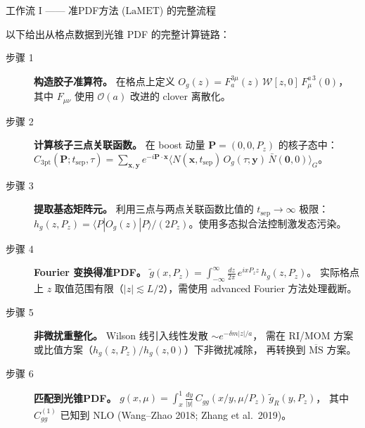 \documentclass[10pt,aspectratio=169]{beamer}
\newcommand{\msbar}{\overline{\mathrm{MS}}}
\newcommand{\LaMET}{\mathrm{LaMET}}
\begin{document}
\begin{frame}{工作流 I —— 准PDF方法 ($\LaMET$) 的完整流程}

  以下给出从格点数据到光锥 PDF 的完整计算链路：

  \begin{description}
    \item[步骤 1] \textbf{构造胶子准算符。} 在格点上定义
    $O_g(z) = F_a^{3\mu}(z)\, \mathcal{W}[z,0]\, F_{\mu}^{a\,3}(0)$，
    其中 $F_{\mu\nu}$ 使用 $\mathcal{O}(a)$ 改进的 clover 离散化。

    \item[步骤 2] \textbf{计算核子三点关联函数。} 在 boost 动量 $\mathbf{P} = (0,0,P_z)$ 的核子态中：
    $C_{3\mathrm{pt}}(\mathbf{P}; t_{\mathrm{sep}}, \tau) = \sum_{\mathbf{x},\mathbf{y}} e^{-i\mathbf{P}\cdot\mathbf{x}}
    \langle N(\mathbf{x}, t_{\mathrm{sep}})\, O_g(\tau;\mathbf{y})\, \bar{N}(\mathbf{0}, 0) \rangle_G$。

    \item[步骤 3] \textbf{提取基态矩阵元。} 利用三点与两点关联函数比值的 $t_{\mathrm{sep}} \to \infty$ 极限：
    $h_g(z, P_z) = \langle P| O_g(z) |P \rangle / (2P_z)$。使用多态拟合法控制激发态污染。

    \item[步骤 4] \textbf{Fourier 变换得准PDF。}
    $\tilde{g}(x, P_z) = \int_{-\infty}^{\infty} \frac{dz}{2\pi}\, e^{i x P_z z}\, h_g(z, P_z)$。
    实际格点上 $z$ 取值范围有限（$|z| \lesssim L/2$），需使用 advanced Fourier 方法处理截断。

    \item[步骤 5] \textbf{非微扰重整化。} Wilson 线引入线性发散 $\sim e^{-\delta m|z|/a}$，
    需在 RI/MOM 方案或比值方案（$h_g(z,P_z)/h_g(z,0)$）下非微扰减除，
    再转换到 $\msbar$ 方案。

    \item[步骤 6] \textbf{匹配到光锥PDF。}
    $g(x, \mu) = \int_x^1 \frac{dy}{|y|}\,
    C_{gg}(x/y, \mu/P_z)\, \tilde{g}_R(y, P_z)$，
    其中 $C_{gg}^{(1)}$ 已知到 NLO (Wang--Zhao 2018; Zhang et al.\ 2019)。
  \end{description}
\end{frame}
\end{document}
